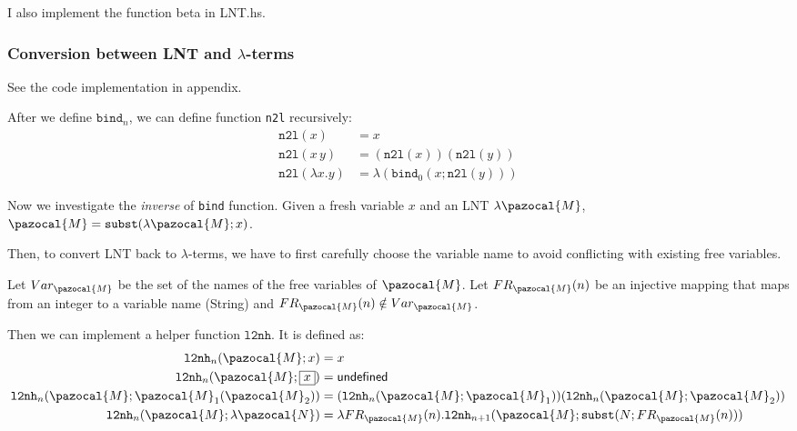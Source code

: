 \documentclass{article}
\theoremstyle{definition}
\newcommand{\lb}{$\lambda$}
\begin{document}
I also implement the function \textsf{beta} in \textsf{LNT.hs}.

\subsubsection*{Conversion between LNT and \lb-terms}

See the code implementation in appendix.

After we define $\mathtt{bind}_n$, we can define function \texttt{n2l} recursively:
\begin{align*}
    \mathtt{n2l}(x)           & = x                                            \\
    \mathtt{n2l}(x\, y)       & = (\mathtt{n2l}(x))(\mathtt{n2l}(y))           \\
    \mathtt{n2l}(\lambda x.y) & = \lambda (\mathtt{bind}_0(x;\mathtt{n2l}(y)))
\end{align*}

Now we investigate the \emph{inverse} of \texttt{bind} function.
Given a fresh variable $x$ and an LNT $\lambda\pazocal{M}$, $\pazocal{M} = \mathtt{subst}(\lambda \pazocal{M};x)$.

Then, to convert LNT back to \lb-terms, we have to first carefully choose the variable name to avoid conflicting with existing free variables.

Let $Var_\pazocal{M}$ be the set of the names of the free variables of $\pazocal{M}$.
Let $FR_\pazocal{M}(n)$ be an injective mapping that maps from an integer to a variable name (String) and $FR_\pazocal{M}(n)\notin Var_\pazocal{M}$.

Then we can implement a helper function $\mathtt{l2nh}$.
It is defined as:
\begin{align*}
    \mathtt{l2nh}_n(\pazocal{M};x)                            & = x                                                                                                \\
    \mathtt{l2nh}_n(\pazocal{M};\fbox{$x$})                   & = \textsf{undefined}                                                                               \\
    \mathtt{l2nh}_n(\pazocal{M};\pazocal{M}_1(\pazocal{M}_2)) & = (\mathtt{l2nh}_n(\pazocal{M};\pazocal{M}_1))(\mathtt{l2nh}_n(\pazocal{M};\pazocal{M}_2))         \\
    \mathtt{l2nh}_n(\pazocal{M};\lambda \pazocal{N})          & = \lambda FR_\pazocal{M}(n).\mathtt{l2nh}_{n+1}(\pazocal{M};\mathtt{subst}(N; FR_\pazocal{M} (n))) \\
\end{align*}
\end{document}

